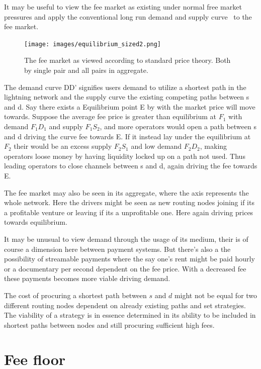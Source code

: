 It may be useful to view the fee market as existing under normal free market pressures and apply the conventional long run demand and supply curve~\cite{boulding:evolutionary:economy} to the fee market. 

\begin{figure}[!htb]
	\hspace*{-0.3cm}
	\centering
	\texttt{[image: images/equilibrium\_sized2.png]}
	\caption{ The fee market as viewed according to standard price theory. Both by single pair and all pairs in aggregate. 
		}
		\label{fig:equilibrium}
		\hspace*{2mm} 	
\end{figure}

The demand curve DD' signifies users demand to utilize a shortest path in the lightning network and the supply curve the existing competing paths between s and d. Say there exists a Equilibrium point E by with the market price will move towards. Suppose the average fee price is greater than equilibrium at $F_{1}$ with demand $F_{1}D_{1}$ and supply $F_{1}S_{2}$, and more operators would open a path between s and d driving the curve fee towards E. If it instead lay under the equilibrium at $F_2$ their would be an excess supply $F_{2}S_{1}$ and low demand $F_{2}D_{2}$, making operators loose money by having liquidity locked up on a path not used. Thus leading operators to close channels between s and d, again driving the fee towards E.

The fee market may also be seen in its aggregate, where the axis represents the whole network. Here the drivers might be seen as new routing nodes joining if its a profitable venture or leaving if its a unprofitable one. Here again driving prices towards equilibrium. 

It may be unusual to view demand through the usage of its medium, their is of course a dimension here between payment systems. But there's also a the possibility of streamable payments where the say one's rent might be paid hourly or a documentary per second dependent on the fee price. With a decreased fee these payments becomes more viable driving demand.

The cost of procuring a shortest path between $s$ and $d$ might not be equal for two different routing nodes dependent on already existing paths and set strategies. The viability of a strategy is in essence determined in its ability to be included in shortest paths between nodes and still procuring sufficient high fees.

\section{Fee floor}


